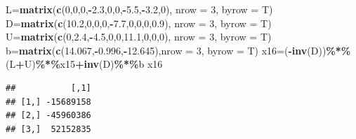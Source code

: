 \documentclass[
]{article}
\newenvironment{Shaded}{\begin{snugshade}}{\end{snugshade}}
\newcommand{\AttributeTok}[1]{\textcolor[rgb]{0.13,0.29,0.53}{#1}}
\newcommand{\DecValTok}[1]{\textcolor[rgb]{0.00,0.00,0.81}{#1}}
\newcommand{\FloatTok}[1]{\textcolor[rgb]{0.00,0.00,0.81}{#1}}
\newcommand{\FunctionTok}[1]{\textcolor[rgb]{0.13,0.29,0.53}{\textbf{#1}}}
\newcommand{\NormalTok}[1]{#1}
\newcommand{\OtherTok}[1]{\textcolor[rgb]{0.56,0.35,0.01}{#1}}
\newcommand{\SpecialCharTok}[1]{\textcolor[rgb]{0.81,0.36,0.00}{\textbf{#1}}}
\begin{document}
\begin{Shaded}
\begin{Highlighting}[]
\NormalTok{  L}\OtherTok{=}\FunctionTok{matrix}\NormalTok{(}\FunctionTok{c}\NormalTok{(}\DecValTok{0}\NormalTok{,}\DecValTok{0}\NormalTok{,}\DecValTok{0}\NormalTok{,}\SpecialCharTok{{-}}\FloatTok{2.3}\NormalTok{,}\DecValTok{0}\NormalTok{,}\DecValTok{0}\NormalTok{,}\SpecialCharTok{{-}}\FloatTok{5.5}\NormalTok{,}\SpecialCharTok{{-}}\FloatTok{3.2}\NormalTok{,}\DecValTok{0}\NormalTok{), }\AttributeTok{nrow =} \DecValTok{3}\NormalTok{, }\AttributeTok{byrow =}\NormalTok{ T)}
\NormalTok{  D}\OtherTok{=}\FunctionTok{matrix}\NormalTok{(}\FunctionTok{c}\NormalTok{(}\FloatTok{10.2}\NormalTok{,}\DecValTok{0}\NormalTok{,}\DecValTok{0}\NormalTok{,}\DecValTok{0}\NormalTok{,}\SpecialCharTok{{-}}\FloatTok{7.7}\NormalTok{,}\DecValTok{0}\NormalTok{,}\DecValTok{0}\NormalTok{,}\DecValTok{0}\NormalTok{,}\FloatTok{0.9}\NormalTok{), }\AttributeTok{nrow =} \DecValTok{3}\NormalTok{, }\AttributeTok{byrow =}\NormalTok{ T)}
\NormalTok{  U}\OtherTok{=}\FunctionTok{matrix}\NormalTok{(}\FunctionTok{c}\NormalTok{(}\DecValTok{0}\NormalTok{,}\FloatTok{2.4}\NormalTok{,}\SpecialCharTok{{-}}\FloatTok{4.5}\NormalTok{,}\DecValTok{0}\NormalTok{,}\DecValTok{0}\NormalTok{,}\FloatTok{11.1}\NormalTok{,}\DecValTok{0}\NormalTok{,}\DecValTok{0}\NormalTok{,}\DecValTok{0}\NormalTok{), }\AttributeTok{nrow =} \DecValTok{3}\NormalTok{, }\AttributeTok{byrow =}\NormalTok{ T)}
\NormalTok{  b}\OtherTok{=}\FunctionTok{matrix}\NormalTok{(}\FunctionTok{c}\NormalTok{(}\FloatTok{14.067}\NormalTok{,}\SpecialCharTok{{-}}\FloatTok{0.996}\NormalTok{,}\SpecialCharTok{{-}}\FloatTok{12.645}\NormalTok{),}\AttributeTok{nrow =} \DecValTok{3}\NormalTok{, }\AttributeTok{byrow =}\NormalTok{ T)}
\NormalTok{  x16}\OtherTok{=}\NormalTok{(}\SpecialCharTok{{-}}\FunctionTok{inv}\NormalTok{(D))}\SpecialCharTok{\%*\%}\NormalTok{(L}\SpecialCharTok{+}\NormalTok{U)}\SpecialCharTok{\%*\%}\NormalTok{x15}\SpecialCharTok{+}\FunctionTok{inv}\NormalTok{(D)}\SpecialCharTok{\%*\%}\NormalTok{b}
\NormalTok{  x16}
\end{Highlighting}
\end{Shaded}

\begin{verbatim}
##           [,1]
## [1,] -15689158
## [2,] -45960386
## [3,]  52152835
\end{verbatim}
\end{document}
